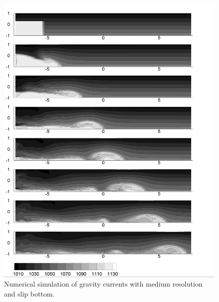 \begin{figure}[htbp]
\includegraphics[width=6in]{../figures/GraCur/GraCur-1-Dom-Medium-RCIP1-Slip.pdf}
\caption{Numerical simulation of gravity currents with medium resolution and slip bottom.}
\label{fig:GraCur-1-Dom-Medium-RCIP1-Slip}
\end{figure}

